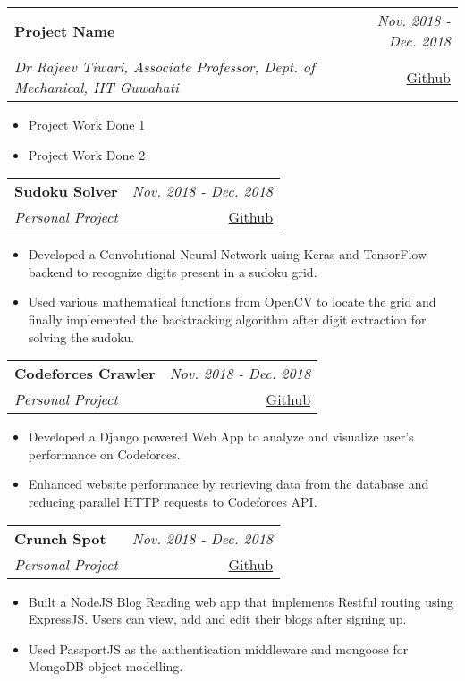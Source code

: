 \documentclass[a4paper,11pt]{article}
\makeatletter
\newcommand{\resumeProject}[4]{
\vspace{0.5mm}\item
    \begin{tabular*}{0.98\textwidth}[t]{l@{\extracolsep{\fill}}r}
        \textbf{#1} & \textit{\footnotesize{#3}} \\
        \footnotesize{\textit{#2}} & \footnotesize{#4}
    \end{tabular*}
    \vspace{-3.4mm}
}
\newcommand{\resumeItemListStart}{\begin{justify}\begin{itemize}[leftmargin=3ex, rightmargin=2ex, noitemsep,labelsep=1.2mm,itemsep=0mm]\small}
\newcommand{\resumeItemListEnd}{\end{itemize}\end{justify}\vspace{-2mm}}
\makeatother
\begin{document}
    \resumeProject
      {Project Name} %
      {Dr Rajeev  Tiwari, Associate Professor, Dept. of Mechanical, IIT Guwahati} %
      {Nov. 2018 - Dec. 2018} %
      {\href{Link to github}{Github}} %
      \resumeItemListStart
        \item {Project Work Done 1}
        \item {Project Work Done 2}
    \resumeItemListEnd
    \vspace{-2.5mm}
    \resumeProject
      {Sudoku Solver} %
      {Personal Project} %
      {Nov. 2018 - Dec. 2018} %
      {\href{Link to github}{Github}} %
      \resumeItemListStart
        \item {Developed a Convolutional Neural Network using Keras and TensorFlow backend to recognize digits present in a sudoku grid.}
        \item {Used various mathematical functions from OpenCV to locate the grid and finally implemented the backtracking algorithm after digit extraction for solving the sudoku.}
    \resumeItemListEnd
    \vspace{-2.5mm}
    \resumeProject
      {Codeforces Crawler} %
      {Personal Project} %
      {Nov. 2018 - Dec. 2018} %
      {\href{Link to github}{Github}} %
      \resumeItemListStart
        \item {Developed a Django powered Web App to analyze and visualize user's performance on Codeforces.}
        \item {Enhanced website performance by retrieving data from the database and reducing parallel HTTP requests to Codeforces API.}
    \resumeItemListEnd
    \vspace{-2.5mm}
    \resumeProject
      {Crunch Spot} %
      {Personal Project} %
      {Nov. 2018 - Dec. 2018} %
      {\href{Link to github}{Github}} %
      \resumeItemListStart
        \item {Built a NodeJS Blog Reading web app that implements Restful routing using ExpressJS. Users can view, add and edit their blogs after signing up.}
        \item {Used PassportJS as the authentication middleware and mongoose for MongoDB object modelling.}
    \resumeItemListEnd
    \vspace{-2.5mm}
    
      
\end{document}
